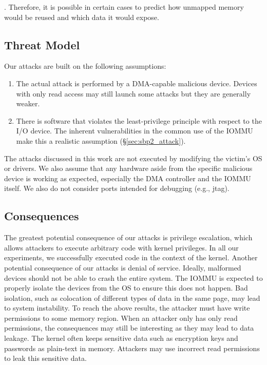. Therefore, it is possible in certain cases to predict how unmapped memory would be reused and which data it would expose.  
\subsection{Threat Model}
Our attacks are built on the following assumptions:
\begin{enumerate}
    \item The actual attack is performed by a DMA-capable malicious device. Devices with only read access may still launch some attacks but they are generally weaker. 
    \item There is software that violates the least-privilege principle with respect to the I/O device. The inherent vulnerabilities in the common use of the IOMMU make this a realistic assumption (§\ref{sec:sbp2_attack}). 
 \end{enumerate}
 The attacks discussed in this work are not executed by modifying the victim’s OS or drivers. We also assume that any hardware aside from the specific malicious device is working as expected, especially the DMA controller and the IOMMU itself. We also do not consider ports intended for debugging (e.g., jtag).
\subsection{Consequences}
The greatest potential consequence of our attacks is privilege escalation, which allows attackers to execute arbitrary code with kernel privileges. In all our experiments, we successfully executed code in the context of the kernel. Another potential consequence of our attacks is denial of service. Ideally, malformed devices should not be able to crash the entire system. The IOMMU is expected to properly isolate the devices from the OS to ensure this does not happen. Bad isolation, such as colocation of different types of data in the same page, may lead to system instability. To reach the above results, the attacker must have write permissions to some memory region. When an attacker only has only read permissions, the consequences may still be interesting as they may lead to data leakage. The kernel often keeps sensitive data such as encryption keys and passwords as plain-text in memory. Attackers may use incorrect read permissions to leak this sensitive data.
